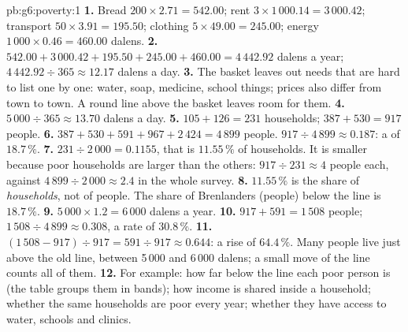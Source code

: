 \begin{solution}{pb:g6:poverty:1}
\textbf{1.} Bread $200 \times 2.71 = 542.00$; rent $3 \times 1\,000.14 = 3\,000.42$;
transport $50 \times 3.91 = 195.50$; clothing $5 \times 49.00 = 245.00$; energy
$1\,000 \times 0.46 = 460.00$ dalens.
\textbf{2.} $542.00 + 3\,000.42 + 195.50 + 245.00 + 460.00 = 4\,442.92$ dalens a year;
$4\,442.92 \div 365 \approx 12.17$ dalens a day.
\textbf{3.} The basket leaves out needs that are hard to list one by one: water,
soap, medicine, school things; prices also differ from town to town. A round
line above the basket leaves room for them.
\textbf{4.} $5\,000 \div 365 \approx 13.70$ dalens a day.
\textbf{5.} $105 + 126 = 231$ households; $387 + 530 = 917$ people.
\textbf{6.} $387 + 530 + 591 + 967 + 2\,424 = 4\,899$ people. $917 \div 4\,899
\approx 0.187$: a  of $18.7\,\%$.
\textbf{7.} $231 \div 2\,000 = 0.1155$, that is $11.55\,\%$ of households. It is
smaller because poor households are larger than the others: $917 \div 231 \approx 4$
people each, against $4\,899 \div 2\,000 \approx 2.4$ in the whole survey.
\textbf{8.} $11.55\,\%$ is the share of \emph{households}, not of people. The share
of Brenlanders (people) below the line is $18.7\,\%$.
\textbf{9.} $5\,000 \times 1.2 = 6\,000$ dalens a year.
\textbf{10.} $917 + 591 = 1\,508$ people; $1\,508 \div 4\,899 \approx 0.308$, a rate
of $30.8\,\%$.
\textbf{11.} $(1\,508 - 917) \div 917 = 591 \div 917 \approx 0.644$: a rise of
$64.4\,\%$. Many people live just above the old line, between 5\,000 and 6\,000
dalens; a small move of the line counts all of them.
\textbf{12.} For example: how far below the line each poor person is (the table
groups them in bands); how income is shared inside a household; whether the same
households are poor every year; whether they have access to water, schools and
clinics.
\end{solution}
